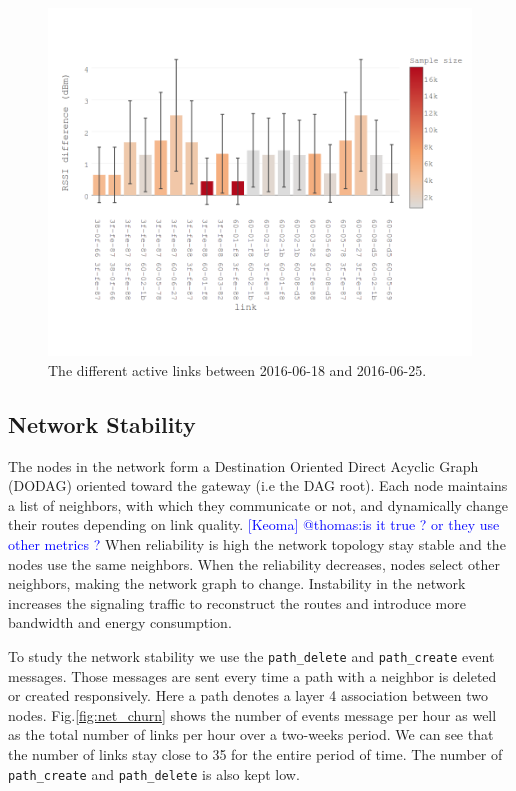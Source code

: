 \documentclass{sig-alternate}
\newcommand{\keoma}[1]       {\textcolor{blue}{[Keoma] #1}}
\newcommand{\pathcreate}     {{\tt path\_create}\xspace}
\newcommand{\pathdelete}     {{\tt path\_delete}\xspace}
\begin{document}
\begin{figure}
    \centering
    \includegraphics[width=\columnwidth]{sym_plot}
    \caption{The different active links between 2016-06-18 and 2016-06-25.}
    \label{fig:tab_symmetry}
\end{figure}

\subsection{Network Stability}
\label{sec:net_stability}


The nodes in the network form a Destination Oriented Direct Acyclic Graph (DODAG) oriented toward the gateway (i.e the DAG root).
Each node maintains a list of neighbors, with which they communicate or not, and dynamically change their routes depending on link quality. \keoma{@thomas:is it true ? or they use other metrics ?}
When reliability is high the network topology stay stable and the nodes use the same neighbors.
When the reliability decreases, nodes select other neighbors, making the network graph to change.
Instability in the network increases the signaling traffic to reconstruct the routes and introduce more bandwidth and energy consumption.


To study the network stability we use the \pathdelete and \pathcreate event messages.
Those messages are sent every time a path with a neighbor is deleted or created responsively.
Here a path denotes a layer 4 association between two nodes.
Fig.\ref{fig:net_churn} shows the number of events message per hour as well as the total number of links per hour over a two-weeks period.
We can see that the number of links stay close to 35 for the entire period of time.
The number of \pathcreate and \pathdelete is also kept low.
\end{document}
